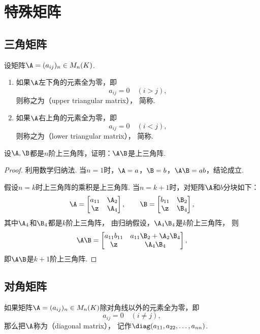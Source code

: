 \section{特殊矩阵}
\subsection{三角矩阵}
\begin{definition}
设矩阵\(\A=(a_{ij})_n \in M_n(K)\).
\begin{enumerate}
	\item 如果\(\A\)左下角的元素全为零，即\[
		a_{ij} = 0
		\quad(i>j),
	\]
	则称之为（upper triangular matrix），
	简称.

	\item 如果\(\A\)右上角的元素全为零，即\[
		a_{ij} = 0
		\quad(i<j),
	\]
	则称之为（lower triangular matrix），
	简称.
\end{enumerate}
\end{definition}

\begin{example}
设\(\A,\B\)都是\(n\)阶上三角阵，证明：\(\A\B\)是上三角阵.
\begin{proof}
利用数学归纳法.
当\(n=1\)时，\(\A=a\)，\(\B=b\)，\(\A\B = ab\)，结论成立.

假设\(n=k\)时上三角阵的乘积是上三角阵.
当\(n=k+1\)时，对矩阵\(\A\)和\(b\)分块如下：\[
	\A = \begin{bmatrix}
		a_{11} & \A_2 \\
		\z & \A_4
	\end{bmatrix},
	\qquad
	\B = \begin{bmatrix}
		b_{11} & \B_2 \\
		\z & \B_4
	\end{bmatrix},
\]
其中\(\A_4\)和\(\B_4\)都是\(k\)阶上三角阵，
由归纳假设，\(\A_4 \B_4\)是\(k\)阶上三角阵，
则\[
	\A\B = \begin{bmatrix}
		a_{11} b_{11} & a_{11} \B_2 + \A_2 \B_4 \\
		\z & \A_4 \B_4
	\end{bmatrix},
\]
即\(\A\B\)是\(k+1\)阶上三角阵.
\end{proof}
\end{example}

\subsection{对角矩阵}
\begin{definition}
如果矩阵\(\A=(a_{ij})_n \in M_n(K)\)除对角线以外的元素全为零，即\[
	a_{ij} = 0
	\quad(i \neq j),
\]
那么把\(\A\)称为（diagonal matrix），
记作\(\diag(a_{11},a_{22},\dotsc,a_{nn})\).
\end{definition}

